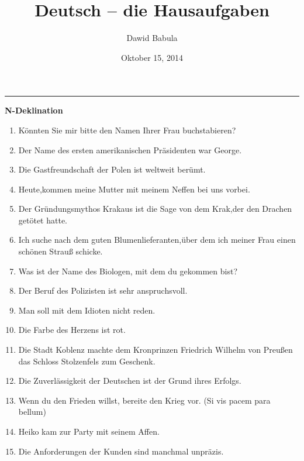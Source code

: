 \documentclass[a4paper,12pt]{article}
\author{Dawid Babula}
\title{Deutsch -- die Hausaufgaben}
\date{Oktober 15, 2014}
\makeatletter
\def\thickhrulefill{\leavevmode \leaders \hrule height 1pt\hfill \kern \z@}
\def\maketitle{%
    \null
    \thispagestyle{empty}%
    \vfill
    \begin{center}\leavevmode
    \normalfont
    {\LARGE\raggedleft \@author\par}%
    \thickhrulefill\par
    {\huge\raggedright \@title\par}%
    \vskip 1cm
    \end{center}%
    \vfill
    {\Large \@date\par}%
    \null
    \cleardoublepage
    }
\makeatother
\begin{document}
\maketitle

\textbf{\large N-Deklination}
\vspace{2pc}
\begin{enumerate}
    \item K\"onnten Sie mir bitte den Namen Ihrer Frau buchstabieren?
    \item Der Name des ersten amerikanischen Pr\"asidenten war George.
    \item Die Gastfreundschaft der Polen ist weltweit ber\"umt.
    \item Heute,kommen meine Mutter mit meinem Neffen bei uns vorbei.
    \item Der Gr\"undungsmythos Krakaus ist die Sage von dem Krak,der den Drachen get\"otet hatte.
    \item Ich suche nach dem guten Blumenlieferanten,\"uber dem ich meiner Frau einen sch\"onen Strau{\ss} schicke.
    \item Was ist der Name des Biologen, mit dem du gekommen bist?
    \item Der Beruf des Polizisten ist sehr anspruchsvoll.
    \item Man soll mit dem Idioten nicht reden.
    \item Die Farbe des Herzens ist rot.
    \item Die Stadt Koblenz machte dem Kronprinzen Friedrich Wilhelm von Preu{\ss}en das Schloss Stolzenfels zum Geschenk.
    \item Die Zuverl\"assigkeit der Deutschen ist der Grund ihres Erfolgs.
    \item Wenn du den Frieden willst, bereite den Krieg vor. (Si vis pacem para bellum)
    \item Heiko kam zur Party mit seinem Affen.
    \item Die Anforderungen der Kunden sind manchmal unpr\"azis.
\end{enumerate}
\end{document}
